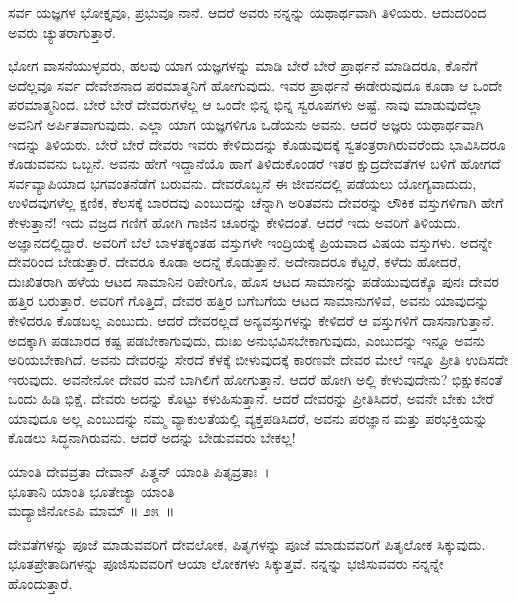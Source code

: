\begin{artha}
ಸರ್ವ ಯಜ್ಞಗಳ ಭೋಕ್ತೃವೂ, ಪ್ರಭುವೂ ನಾನೆ. ಆದರೆ ಅವರು ನನ್ನನ್ನು ಯಥಾರ್ಥವಾಗಿ ತಿಳಿಯರು. ಆದುದರಿಂದ ಅವರು ಚ್ಯುತರಾಗುತ್ತಾರೆ.
\end{artha}

ಭೋಗ ವಾಸನೆಯುಳ್ಳವರು, ಹಲವು ಯಾಗ ಯಜ್ಞಗಳನ್ನು ಮಾಡಿ ಬೇರೆ ಬೇರೆ ಪ್ರಾರ್ಥನೆ ಮಾಡಿದರೂ, ಕೊನೆಗೆ ಅದೆಲ್ಲವೂ ಸರ್ವ ದೇವೇಶನಾದ ಪರಮಾತ್ಮನಿಗೆ ಹೋಗುವುದು. ಇವರ ಪ್ರಾರ್ಥನೆ ಈಡೇರುವುದೂ ಕೂಡಾ ಆ ಒಂದೇ ಪರಮಾತ್ಮನಿಂದ. ಬೇರೆ ಬೇರೆ ದೇವರುಗಳೆಲ್ಲ ಆ ಒಂದೇ ಭಿನ್ನ ಭಿನ್ನ ಸ್ವರೂಪಗಳು ಅಷ್ಟೆ. ನಾವು ಮಾಡುವುದೆಲ್ಲಾ ಅವನಿಗೆ ಅರ್ಪಿತವಾಗುವುದು. ಎಲ್ಲಾ ಯಾಗ ಯಜ್ಞಗಳಿಗೂ ಒಡೆಯನು ಅವನು. ಆದರೆ ಅಜ್ಞರು ಯಥಾರ್ಥವಾಗಿ ಇದನ್ನು ತಿಳಿಯರು. ಬೇರೆ ಬೇರೆ ದೇವರು ಇವರು ಕೇಳಿದುದನ್ನು ಕೊಡುವುದಕ್ಕೆ ಸ್ವತಂತ್ರರಾಗಿರುವರೆಂದು ಭಾವಿಸಿದರೂ ಕೊಡುವವನು ಒಬ್ಬನೆ. ಅವನು ಹೇಗೆ ಇದ್ದಾನೆಯೊ ಹಾಗೆ ತಿಳಿದುಕೊಂಡರೆ ಇತರ ಕ್ಷುದ್ರದೇವತೆಗಳ ಬಳಿಗೆ ಹೋಗದೆ ಸರ್ವವ್ಯಾಪಿಯಾದ ಭಗವಂತನೆಡೆಗೆ ಬರುವನು. ದೇವರೊಬ್ಬನೆ ಈ ಜೀವನದಲ್ಲಿ ಪಡೆಯಲು ಯೋಗ್ಯವಾದುದು, ಉಳಿದವುಗಳೆಲ್ಲ ಕ್ಷಣಿಕ, ಕೆಲಸಕ್ಕೆ ಬಾರದವು ಎಂಬುದನ್ನು ಚೆನ್ನಾಗಿ ಅರಿತವನು ದೇವರನ್ನು ಲೌಕಿಕ ವಸ್ತುಗಳಿಗಾಗಿ ಹೇಗೆ ಕೇಳುತ್ತಾನೆ! ಇದು ವಜ್ರದ ಗಣಿಗೆ ಹೋಗಿ ಗಾಜಿನ ಚೂರನ್ನು ಕೇಳಿದಂತೆ. ಆದರೆ ಇದು ಅವರಿಗೆ ತಿಳಿಯದು. ಅಜ್ಞಾನದಲ್ಲಿದ್ದಾರೆ. ಅವರಿಗೆ ಬೆಲೆ ಬಾಳತಕ್ಕಂತಹ ವಸ್ತುಗಳೇ ಇಂದ್ರಿಯಕ್ಕೆ ಪ್ರಿಯವಾದ ವಿಷಯ ವಸ್ತುಗಳು. ಅದನ್ನೇ ದೇವರಿಂದ ಬೇಡುತ್ತಾರೆ. ದೇವರೂ ಕೂಡಾ ಅದನ್ನೆ ಕೊಡುತ್ತಾನೆ. ಅದೇನಾದರೂ ಕೆಟ್ಟರೆ, ಕಳೆದು ಹೋದರೆ, ದುಃಖಿತರಾಗಿ ಹಳೆಯ ಆಟದ ಸಾಮಾನಿನ ರಿಪೇರಿಗೊ, ಹೊಸ ಆಟದ ಸಾಮಾನನ್ನು ಪಡೆಯುವುದಕ್ಕೊ ಪುನಃ ದೇವರ ಹತ್ತಿರ ಬರುತ್ತಾರೆ. ಅವರಿಗೆ ಗೊತ್ತಿದೆ, ದೇವರ ಹತ್ತಿರ ಬಗೆಬಗೆಯ ಆಟದ ಸಾಮಾನುಗಳಿವೆ, ಅವನು ಯಾವುದನ್ನು ಕೇಳಿದರೂ ಕೊಡಬಲ್ಲ ಎಂಬುದು. ಆದರೆ ದೇವರಲ್ಲದೆ ಅನ್ಯವಸ್ತುಗಳನ್ನು ಕೇಳಿದರೆ ಆ ವಸ್ತುಗಳಿಗೆ ದಾಸನಾಗುತ್ತಾನೆ. ಅದಕ್ಕಾಗಿ ಪಡಬಾರದ ಕಷ್ಟ ಪಡಬೇಕಾಗುವುದು, ದುಃಖ ಅನುಭವಿಸಬೇಕಾಗುವುದು, ಎಂಬುದನ್ನು ಇನ್ನೂ ಅವನು ಅರಿಯಬೇಕಾಗಿದೆ. ಅವನು ದೇವರನ್ನು ಸೇರದೆ ಕೆಳಕ್ಕೆ ಬೀಳುವುದಕ್ಕೆ ಕಾರಣವೇ ದೇವರ ಮೇಲೆ ಇನ್ನೂ ಪ್ರೀತಿ ಉದಿಸದೇ ಇರುವುದು. ಅವನೇನೋ ದೇವರ ಮನೆ ಬಾಗಿಲಿಗೆ ಹೋಗುತ್ತಾನೆ. ಆದರೆ ಹೋಗಿ ಅಲ್ಲಿ ಕೇಳುವುದೇನು? ಭಿಕ್ಷುಕನಂತೆ ಒಂದು ಹಿಡಿ ಭಿಕ್ಷೆ. ದೇವರು ಅದನ್ನು ಕೊಟ್ಟು ಕಳುಹಿಸುತ್ತಾನೆ. ಆದರೆ ದೇವರನ್ನು ಪ್ರೀತಿಸಿದರೆ, ಅವನೇ ಬೇಕು ಬೇರೆ ಯಾವುದೂ ಅಲ್ಲ ಎಂಬುದನ್ನು ನಮ್ಮ ವ್ಯಾಕುಲತೆಯಲ್ಲಿ ವ್ಯಕ್ತಪಡಿಸಿದರೆ, ಅವನು ಪರಜ್ಞಾನ ಮತ್ತು ಪರಭಕ್ತಿಯನ್ನು ಕೊಡಲು ಸಿದ್ಧನಾಗಿರುವನು. ಆದರೆ ಅದನ್ನು ಬೇಡುವವರು ಬೇಕಲ್ಲ!

\begin{shloka}
ಯಾಂತಿ ದೇವವ್ರತಾ ದೇವಾನ್ ಪಿತೄನ್ ಯಾಂತಿ ಪಿತೃವ್ರತಾಃ~।\\ಭೂತಾನಿ ಯಾಂತಿ ಭೂತೇಜ್ಯಾ ಯಾಂತಿ\\ ಮದ್ಯಾಜಿನೋಽಪಿ ಮಾಮ್ \hfill॥ ೨೫~॥
\end{shloka}

\begin{artha}
ದೇವತೆಗಳನ್ನು ಪೂಜೆ ಮಾಡುವವರಿಗೆ ದೇವಲೋಕ, ಪಿತೃಗಳನ್ನು ಪೂಜೆ ಮಾಡುವವರಿಗೆ ಪಿತೃ\-ಲೋಕ ಸಿಕ್ಕುವುದು. ಭೂತಪ್ರೇತಾದಿಗಳನ್ನು ಪೂಜಿಸುವವರಿಗೆ ಆಯಾ ಲೋಕಗಳು ಸಿಕ್ಕುತ್ತವೆ. ನನ್ನನ್ನು ಭಜಿಸುವವರು ನನ್ನನ್ನೇ ಹೊಂದುತ್ತಾರೆ.
\end{artha}

